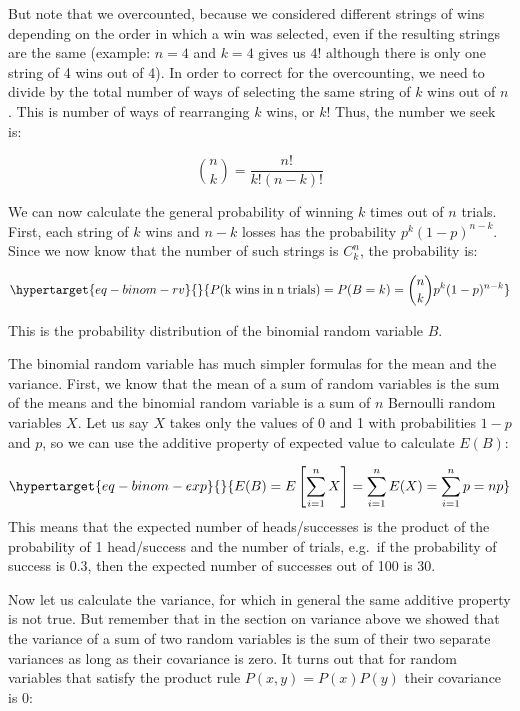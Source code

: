 \documentclass[
  letterpaper,
  DIV=11,
  numbers=noendperiod]{scrreprt}
\begin{document}
But note that we overcounted, because we considered different strings of
wins depending on the order in which a win was selected, even if the
resulting strings are the same (example: \(n=4\) and \(k=4\) gives us
\(4!\) although there is only one string of 4 wins out of 4). In order
to correct for the overcounting, we need to divide by the total number
of ways of selecting the same string of \(k\) wins out of \(n\). This is
number of ways of rearranging \(k\) wins, or \(k!\) Thus, the number we
seek is:

\[\binom{n}{k} = \frac{n!}{k! (n-k)!}\]

We can now calculate the general probability of winning \(k\) times out
of \(n\) trials. First, each string of \(k\) wins and \(n-k\) losses has
the probability \(p^k (1-p)^{n-k}\). Since we now know that the number
of such strings is \(C^n_k\), the probability is:

\begin{equation}\protect\hypertarget{eq-binom-rv}{}{
 P(\mathrm{k \; wins \; in \; n \; trials}) =  P(B=k)= \binom{n}{k}  p^k (1-p)^{n-k}
}\label{eq-binom-rv}\end{equation}

This is the probability distribution of the binomial random variable
\(B\).

The binomial random variable has much simpler formulas for the mean and
the variance. First, we know that the mean of a sum of random variables
is the sum of the means and the binomial random variable is a sum of
\(n\) Bernoulli random variables \(X\). Let us say \(X\) takes only the
values of 0 and 1 with probabilities \(1-p\) and \(p\), so we can use
the additive property of expected value to calculate \(E(B)\):

\begin{equation}\protect\hypertarget{eq-binom-exp}{}{
E(B) = E\left[\sum_{i=1}^n X\right] = \sum_{i=1}^n E(X) = \sum_{i=1}^n p = np 
}\label{eq-binom-exp}\end{equation} This means that the expected number
of heads/successes is the product of the probability of 1 head/success
and the number of trials, e.g.~if the probability of success is 0.3,
then the expected number of successes out of 100 is 30.

Now let us calculate the variance, for which in general the same
additive property is not true. But remember that in the section on
variance above we showed that the variance of a sum of two random
variables is the sum of their two separate variances as long as their
covariance is zero. It turns out that for random variables that satisfy
the product rule \(P(x, y) = P(x)P(y)\) their covariance is 0:
\end{document}
